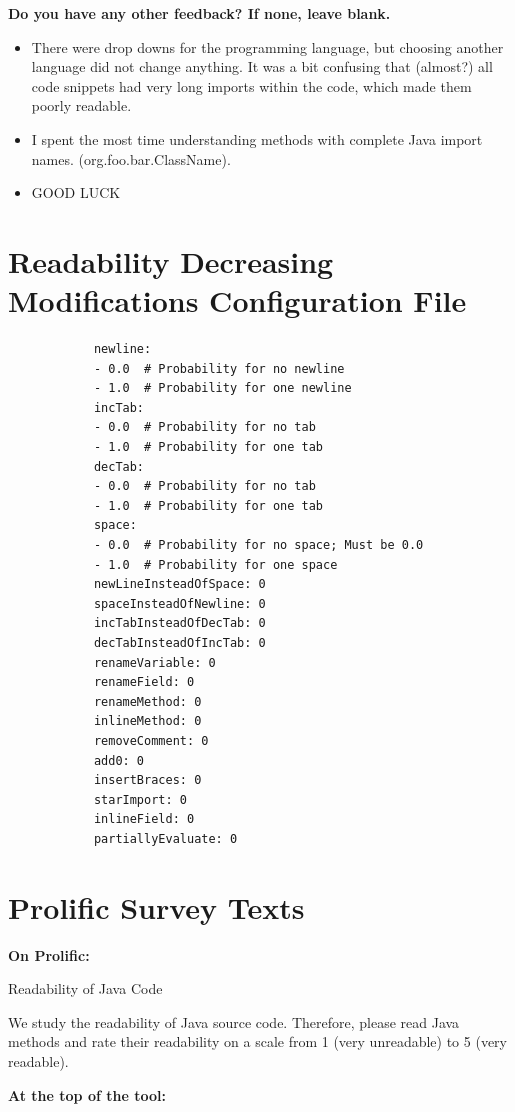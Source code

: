 \documentclass[%
class=scrreprt,
chapterprefix=false,%
open=right,%
twoside=true,%
paper=a4,%
logofile={Logo\_zentral\_farbig\_EN.png},%
thesistype=master,%
UKenglish,%
]{se2thesis}
\theoremstyle{definition}
\newcommand{\RDMs}{Readability Decreasing Modifications\xspace}
\begin{document}
	\pagebreak
	
	\textbf{Do you have any other feedback? If none, leave blank.}
	\begin{itemize}
		\item There were drop downs for the programming language, but choosing another language did not change anything. It was a bit confusing that (almost?) all code snippets had very long imports within the code, which made them poorly readable.
		\item I spent the most time understanding methods with complete Java import names. (org.foo.bar.ClassName).
		\item GOOD LUCK
	\end{itemize}
	

\chapter{\RDMs Configuration File}\label{appendix:rdh-config-file}
	\begin{listing}[h!]
		\begin{verbatim}
			newline:
			- 0.0  # Probability for no newline
			- 1.0  # Probability for one newline
			incTab:
			- 0.0  # Probability for no tab
			- 1.0  # Probability for one tab
			decTab:
			- 0.0  # Probability for no tab
			- 1.0  # Probability for one tab
			space:
			- 0.0  # Probability for no space; Must be 0.0
			- 1.0  # Probability for one space
			newLineInsteadOfSpace: 0
			spaceInsteadOfNewline: 0
			incTabInsteadOfDecTab: 0
			decTabInsteadOfIncTab: 0
			renameVariable: 0
			renameField: 0
			renameMethod: 0
			inlineMethod: 0
			removeComment: 0
			add0: 0
			insertBraces: 0
			starImport: 0
			inlineField: 0
			partiallyEvaluate: 0
		\end{verbatim}
		\label{lst:rdh-config-file}
	\end{listing}
	

\chapter{Prolific Survey Texts}\label{appendix:prolific-survey-texts}
	\textbf{On Prolific:}
	
	Readability of Java Code
	
	We study the readability of Java source code. Therefore, please read Java methods and rate their readability on a scale from 1 (very unreadable) to 5 (very readable).
	
	\textbf{At the top of the tool:}
	
\end{document}
